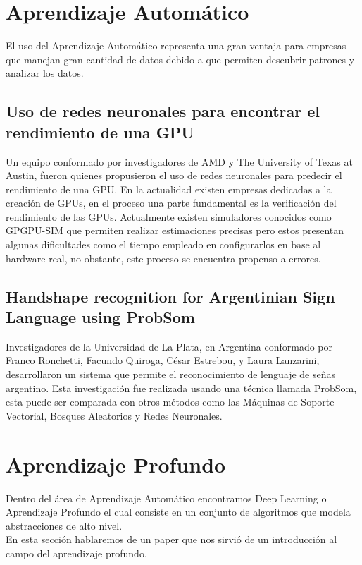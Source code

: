 \section{Aprendizaje Automático}
El uso del Aprendizaje Automático representa una gran ventaja para empresas que manejan gran cantidad de datos debido a que permiten descubrir patrones y analizar los datos.

\subsection{Uso de redes neuronales para encontrar el rendimiento de una GPU}
Un equipo conformado por investigadores \cite{GPU}de AMD y The University of Texas at Austin, fueron quienes propusieron el uso de redes neuronales para predecir el rendimiento de una GPU.
En la actualidad existen empresas dedicadas a la creación de GPUs, en el proceso una parte fundamental es la verificación del rendimiento de las GPUs. Actualmente existen simuladores conocidos como GPGPU-SIM que permiten realizar estimaciones precisas pero estos presentan algunas dificultades como el tiempo empleado en configurarlos en base al hardware real, no obstante, este proceso se encuentra propenso a errores. 
\subsection{Handshape recognition for Argentinian Sign	Language using ProbSom}
Investigadores de la Universidad de La Plata, en Argentina  conformado por Franco Ronchetti, Facundo Quiroga, César Estrebou, y Laura Lanzarini\cite{HAND}, desarrollaron un sistema que permite el reconocimiento de lenguaje de señas argentino. Esta investigación fue realizada usando una técnica llamada ProbSom, esta puede ser comparada con otros métodos como las Máquinas de Soporte Vectorial, Bosques Aleatorios y Redes Neuronales.
\section{Aprendizaje Profundo}
Dentro del área de Aprendizaje Automático encontramos Deep Learning o Aprendizaje Profundo el cual consiste en un conjunto de algoritmos que modela abstracciones de alto nivel.\\
En esta sección hablaremos de un paper que nos sirvió de un introducción al campo del aprendizaje profundo.

